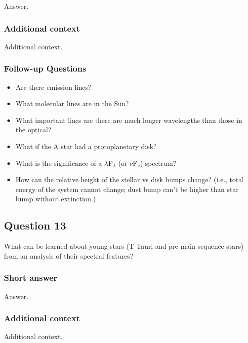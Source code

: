 \documentclass[a4paper,10pt]{article}
\begin{document}
Answer.

\subsubsection{Additional context}

Additional context.

\subsubsection{Follow-up Questions}

\begin{itemize}
    \item Are there emission lines?
    \item What molecular lines are in the Sun?
    \item What important lines are there are much longer wavelengths than those in the optical?
    \item What if the A star had a protoplanetary disk?
    \item What is the significance of a $\lambda$F$_\lambda$ (or $\nu$F$_\nu$) spectrum?
    \item How can the relative height of the stellar vs disk bumps change? (i.e., total energy of the system cannot change; dust bump can't be higher than star bump without extinction.)
\end{itemize}


\newpage
\subsection{Question 13}

What can be learned about young stars (T Tauri and pre-main-sequence stars) from an analysis of their spectral features?

\subsubsection{Short answer}

Answer.

\subsubsection{Additional context}

Additional context.
\end{document}
